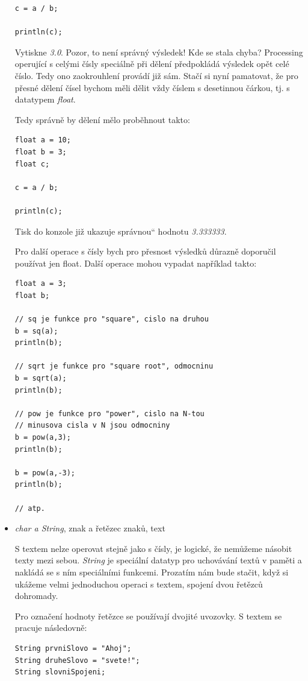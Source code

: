 \documentclass[10pt]{book}
\renewcommand\uv[1]{\quotedblbase #1\textquotedblleft}%
\begin{document}
\begin{itemize}
\begin{lstlisting}
c = a / b;

println(c); 
\end{lstlisting}

Vytiskne {\em 3.0}. Pozor, to není správný výsledek! Kde se stala chyba? Processing operující s celými čísly speciálně při dělení předpokládá výsledek opět celé číslo. Tedy ono zaokrouhlení provádí již sám. Stačí si nyní pamatovat, že pro přesné dělení čísel bychom měli dělit vždy číslem s desetinnou čárkou, tj. s datatypem {\em float}.

Tedy správně by dělení mělo proběhnout takto:

\begin{lstlisting}
float a = 10;
float b = 3;
float c;

c = a / b;

println(c); 
\end{lstlisting}

Tisk do konzole již ukazuje \uv{správnou} hodnotu {\em 3.333333}.

Pro další operace s čísly bych pro přesnost výsledků důrazně doporučil používat jen float. Další operace mohou vypadat například takto:

\begin{lstlisting}
float a = 3;
float b;

// sq je funkce pro "square", cislo na druhou
b = sq(a);
println(b);

// sqrt je funkce pro "square root", odmocninu
b = sqrt(a);
println(b);

// pow je funkce pro "power", cislo na N-tou
// minusova cisla v N jsou odmocniny
b = pow(a,3);
println(b);

b = pow(a,-3);
println(b);

// atp.
\end{lstlisting}

\item{{\em char a String}, znak a řetězec znaků, text}

S textem nelze operovat stejně jako s čísly, je logické, že nemůžeme násobit texty mezi sebou. {\em String} je speciální datatyp pro uchovávání textů v paměti a nakládá se s ním speciálními funkcemi. Prozatím nám bude stačit, když si ukážeme velmi jednoduchou operaci s textem, spojení dvou řetězců dohromady.

Pro označení hodnoty řetězce se používají dvojité uvozovky. S textem se pracuje následovně:

\begin{lstlisting}
String prvniSlovo = "Ahoj";
String druheSlovo = "svete!";
String slovniSpojeni;


\end{lstlisting}
\end{itemize}
\end{document}
